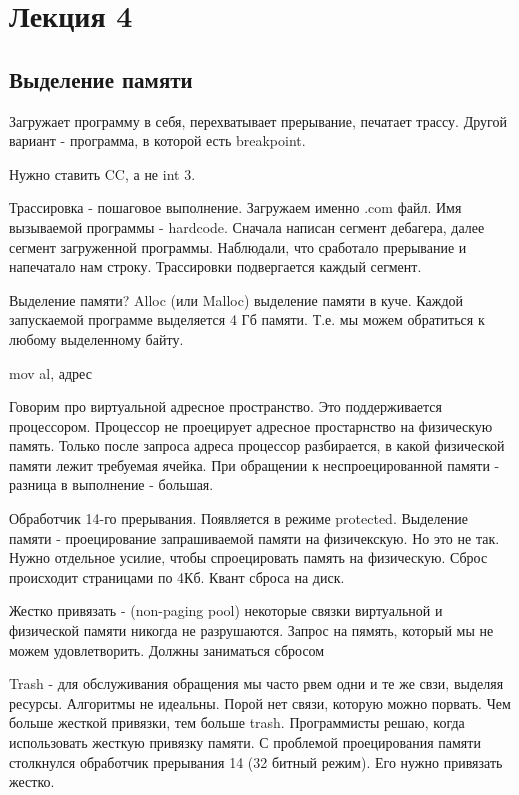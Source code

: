 \section{Лекция 4}
\subsection{Выделение памяти}
Загружает программу в себя, перехватывает прерывание, печатает трассу. 
Другой вариант - программа, в которой есть breakpoint. 
\begin{rem}Нужно ставить CC, а не int 3.\end{rem}

Трассировка - пошаговое выполнение. Загружаем именно .com файл. Имя вызываемой программы - hardcode. Сначала написан сегмент дебагера, далее сегмент загруженной программы. Наблюдали, что сработало прерывание и напечатало нам строку. Трассировки подвергается каждый сегмент. 

Выделение памяти? Alloc (или Malloc) выделение памяти в куче. Каждой запускаемой программе выделяется 4 Гб памяти. Т.е. мы можем обратиться к любому выделенному байту. 

mov al, адрес

Говорим про виртуальной адресное пространство. Это поддерживается процессором. Процессор не проецирует адресное простарнство на физическую память. Только после запроса адреса процессор разбирается, в какой физической памяти лежит требуемая ячейка. При обращении к неспроецированной памяти - разница в выполнение - большая. 

Обработчик 14-го прерывания. Появляется в режиме protected. Выделение памяти - проецирование запрашиваемой памяти на физичекскую. Но это не так. Нужно отдельное усилие, чтобы спроецировать память на физическую. Сброс происходит страницами по 4Кб. Квант сброса на диск.  

\begin{rem} Жестко привязать - (non-paging pool) некоторые связки виртуальной и физической памяти никогда не разрушаются. Запрос на пямять, который мы не можем удовлетворить. Должны заниматься сбросом\end{rem}


Trash - для обслуживания обращения мы часто рвем одни и те же свзи, выделяя ресурсы. Алгоритмы не идеальны. Порой нет связи, которую можно порвать. Чем больше жесткой привязки, тем больше trash.
Программисты решаю, когда использовать жесткую привязку памяти. С проблемой проецирования памяти столкнулся обработчик прерывания 14 (32 битный режим). Его нужно привязать жестко.

